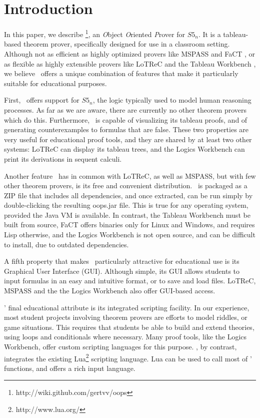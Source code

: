 \section{Introduction}
\label{sec:introduction}

In this paper, we describe \oops\footnote{http://wiki.github.com/gertvv/oops},
an {\it O}bject {\it O}riented {\it P}rover for $S5_n$.
It is a tableau-based theorem prover, specifically designed for use in a
classroom setting.
Although not as efficient as highly optimized provers like MSPASS
\citep{mspass2000} and FaCT \citep{fact1998}, or as flexible as highly
extensible provers like LoTReC \citep{lotrec2005} and the Tableau Workbench
\citep{twb2009}, we believe \oops\ offers a unique combination of features
that make it particularly suitable for educational purposes.

First, \oops\ offers support for $S5_n$, the logic typically used to model
human reasoning processes.
As far as we are aware, there are currently no other theorem provers which do
this.
Furthermore, \oops\ is capable of visualizing its tableau proofs, and of
generating counterexamples to formulas that are false.
These two properties are very useful for educational proof tools, and they are
shared by at least two other systems: LoTReC can display its tableau trees,
and the Logics Workbench \citep{heuerding1996} can print its derivations in
sequent calculi.

Another feature \oops\ has in common with LoTReC, as well as MSPASS, but with
few other theorem provers, is its free and convenient distribution.
\oops\ is packaged as a ZIP file that includes all dependencies, and once
extracted, can be run simply by double-clicking the resulting oops.jar file.
This is true for any operating system, provided the Java VM is available.
In contrast, the Tableau Workbench must be built from source,
FaCT offers binaries only for Linux and Windows, and requires
Lisp otherwise, and the Logics Workbench is not open source, and can be difficult to install, due to outdated dependencies.

A fifth property that makes \oops\ particularly attractive for educational use
is its Graphical User Interface (GUI).
Although simple, its GUI allows students to input formulas in an easy and
intuitive format, or to save and load files.  LoTReC, MSPASS and the the Logics Workbench also offer GUI-based access.

\oops' final educational attribute is its integrated scripting facility.
In our experience, most student projects involving theorem provers are efforts
to model riddles, or game situations.
This requires that students be able to build and extend theories, using loops
and conditionals where necessary.
Many proof tools, like the Logics Workbench, offer custom scripting languages
for this purpose.
\oops, by contrast, integrates the existing Lua\footnote{http://www.lua.org/}
scripting language.
Lua can be used to call most of \oops' functions, and offers a rich input
language.

